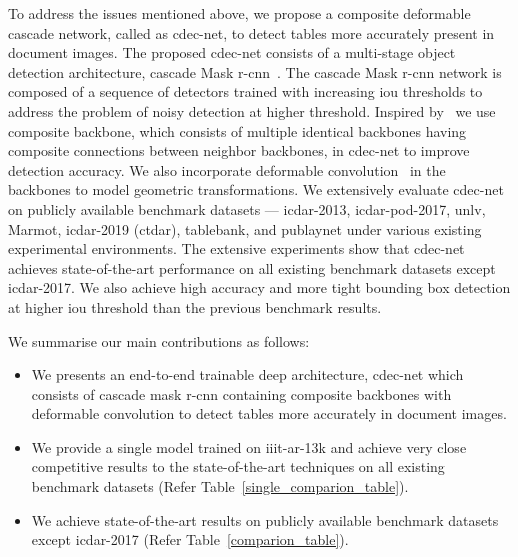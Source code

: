\documentclass[a4paper,conference]{IEEEtran}
\begin{document}
To address the issues mentioned above, we propose a composite deformable cascade network, called as {\sc cd}e{\sc c-n}et, to detect tables more accurately present in document images. The proposed {\sc cd}e{\sc c-n}et consists of a multi-stage object detection architecture, cascade Mask {\sc r-cnn}~\cite{cai2019cascade}. The cascade Mask {\sc r-cnn} network is composed of a sequence of detectors trained with increasing {\sc i}o{\sc u} thresholds to address the problem of noisy detection at higher threshold. Inspired by~\cite{liu2019cbnet} we use composite backbone, which consists of multiple identical backbones having composite connections between neighbor backbones, in {\sc cd}e{\sc c-n}et to improve detection accuracy. We also incorporate deformable convolution~\cite{dai2017deformable} in the backbones to model geometric transformations. We extensively evaluate {\sc cd}e{\sc c-n}et on publicly available benchmark datasets --- {\sc icdar-2013}, {\sc icdar-pod-2017}, {\sc unlv}, Marmot, {\sc icdar-2019} (c{\sc td}a{\sc r}), {\sc t}able{\sc b}ank, and {\sc p}ub{\sc l}ay{\sc n}et under various existing experimental environments. The extensive experiments show that {\sc cd}e{\sc c-n}et achieves state-of-the-art performance on all existing benchmark datasets except {\sc icdar-2017}. We also achieve high accuracy and more tight bounding box detection at higher {\sc i}o{\sc u} threshold than the previous benchmark results. 

We summarise our main contributions as follows: 

\begin{itemize}

\item We presents an end-to-end trainable deep architecture, {\sc cd}e{\sc c-n}et which consists of {\sc c}ascade {\sc m}ask {\sc r-cnn} containing composite backbones with deformable convolution to detect tables more accurately in document images. 

\item We provide a single model trained on {\sc iiit-ar-13k} and achieve very close competitive results to the state-of-the-art techniques on all existing benchmark datasets (Refer Table~\ref{single_comparion_table}).

\item We achieve state-of-the-art results on publicly available benchmark datasets except {\sc icdar-2017} (Refer Table~\ref{comparion_table}).

\end{itemize}
\end{document}
